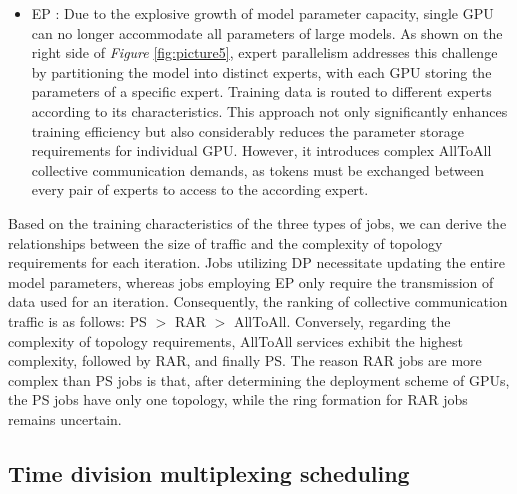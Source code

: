 \documentclass[conference]{IEEEtran}
\begin{document}
\begin{itemize}
	\item EP \cite{MoE}: Due to the explosive growth of model parameter capacity, single GPU can no longer accommodate all parameters of large models. As shown on the right side of \emph{Figure} \ref{fig:picture5}, expert parallelism addresses this challenge by partitioning the model into distinct experts, with each GPU storing the parameters of a specific expert. Training data is routed to different experts according to its characteristics. This approach not only significantly enhances training efficiency but also considerably reduces the parameter storage requirements for individual GPU. However, it introduces complex AllToAll collective communication demands, as tokens must be exchanged between every pair of experts to access to the according expert. 
\end{itemize}


Based on the training characteristics of the three types of jobs, we can derive the relationships between the size of traffic and the complexity of topology requirements for each iteration. Jobs utilizing DP necessitate updating the entire model parameters, whereas jobs employing EP only require the transmission of data used for an iteration. Consequently, the ranking of collective communication traffic is as follows: PS $>$ RAR $>$ AllToAll. Conversely, regarding the complexity of topology requirements, AllToAll services exhibit the highest complexity, followed by RAR, and finally PS. The reason RAR jobs are more complex than PS jobs is that, after determining the deployment scheme of GPUs, the PS jobs have only one topology, while the ring formation for RAR jobs remains uncertain.

\subsection{Time division multiplexing scheduling}
\end{document}
